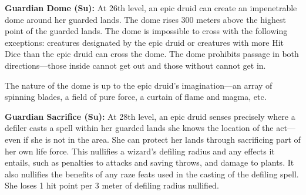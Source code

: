\textbf{Guardian Dome (Su):} At 26th level, an epic druid can create an impenetrable dome around her guarded lands. The dome rises 300 meters above the highest point of the guarded lands. The dome is impossible to cross with the following exceptions: creatures designated by the epic druid or creatures with more Hit Dice than the epic druid can cross the dome. The dome prohibits passage in both directions---those inside cannot get out and those without cannot get in.

The nature of the dome is up to the epic druid's imagination---an array of spinning blades, a field of pure force, a curtain of flame and magma, etc.

\textbf{Guardian Sacrifice (Su):} At 28th level, an epic druid senses precisely where a defiler casts a spell within her guarded lands she knows the location of the act---even if she is not in the area. She can protect her lands through sacrificing part of her own life force. This nullifies a wizard's defiling radius and any effects it entails, such as penalties to attacks and saving throws, and damage to plants. It also nullifies the benefits of any raze feats used in the casting of the defiling spell. She loses 1 hit point per 3 meter of defiling radius nullified.
